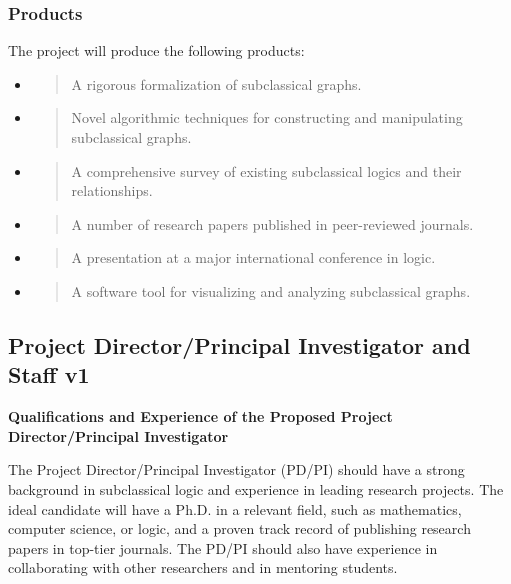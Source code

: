 \hypertarget{products-2}{%
\subsubsection{Products}\label{products-2}}

The project will produce the following products:

\begin{itemize}
\item
  \begin{quote}
  A rigorous formalization of subclassical graphs.
  \end{quote}
\item
  \begin{quote}
  Novel algorithmic techniques for constructing and manipulating
  subclassical graphs.
  \end{quote}
\item
  \begin{quote}
  A comprehensive survey of existing subclassical logics and their
  relationships.
  \end{quote}
\item
  \begin{quote}
  A number of research papers published in peer-reviewed journals.
  \end{quote}
\item
  \begin{quote}
  A presentation at a major international conference in logic.
  \end{quote}
\item
  \begin{quote}
  A software tool for visualizing and analyzing subclassical graphs.
  \end{quote}
\end{itemize}

\hypertarget{project-directorprincipal-investigator-and-staff-v1}{%
\subsection{Project Director/Principal Investigator and Staff
v1}\label{project-directorprincipal-investigator-and-staff-v1}}

\textbf{Qualifications and Experience of the Proposed Project
Director/Principal Investigator}

The Project Director/Principal Investigator (PD/PI) should have a strong
background in subclassical logic and experience in leading research
projects. The ideal candidate will have a Ph.D. in a relevant field,
such as mathematics, computer science, or logic, and a proven track
record of publishing research papers in top-tier journals. The PD/PI
should also have experience in collaborating with other researchers and
in mentoring students.

